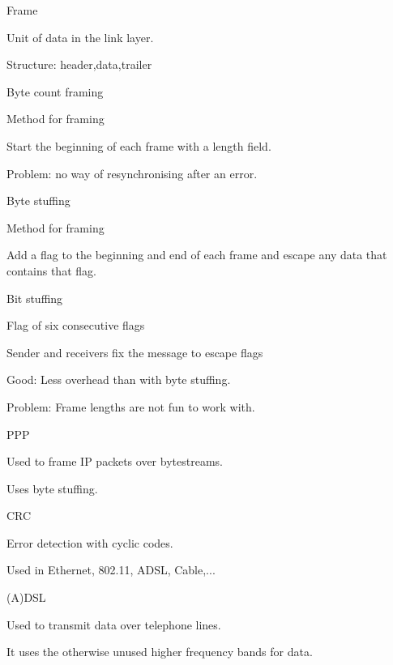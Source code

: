 \documentclass[main.tex]{subfiles}
\begin{document}
\small


\begin{card}{Frame}
\item Unit of data in the link layer.
\item Structure: header,data,trailer
\end{card}

\begin{card}{Byte count framing}
\item Method for framing
\item Start the beginning of each frame with a length field.
\item Problem: no way of resynchronising after an error.
\end{card}

\begin{card}{Byte stuffing}
\item Method for framing
\item Add a flag to the beginning and end of each frame and escape any data that contains that flag.
\end{card}

\begin{card}{Bit stuffing}
\item Flag of six consecutive flags
\item Sender and receivers fix the message to escape flags
\item Good: Less overhead than with byte stuffing.
\item Problem: Frame lengths are not fun to work with.
\end{card}

\begin{card}{PPP}
\item Used to frame IP packets over bytestreams.
\item Uses byte stuffing.
\end{card}

\begin{card}{CRC}
\item Error detection with cyclic codes.
\item Used in Ethernet, 802.11, ADSL, Cable,...
\end{card}

\begin{card}{(A)DSL}
\item Used to transmit data over telephone lines.
\item It uses the otherwise unused higher frequency bands for data.
\end{card}
\end{document}

